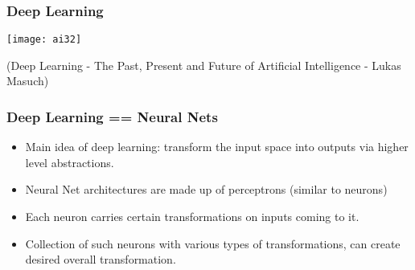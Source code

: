 \begin{frame}[fragile] \frametitle{Deep Learning}
\begin{center}
\texttt{[image: ai32]}
\end{center}
{\tiny (Deep Learning - The Past, Present and Future of Artificial Intelligence - Lukas Masuch)}
\end{frame}




\begin{frame}[fragile] \frametitle{Deep Learning == Neural Nets }

\begin{itemize}
\item Main idea of deep learning: transform the input space into outputs via higher level abstractions.
\item Neural Net architectures are made up of perceptrons (similar to neurons) 
\item Each neuron carries certain transformations on inputs coming to it.
\item Collection of such neurons with various types of transformations, can create desired overall transformation.
\end{itemize}
\end{frame}



